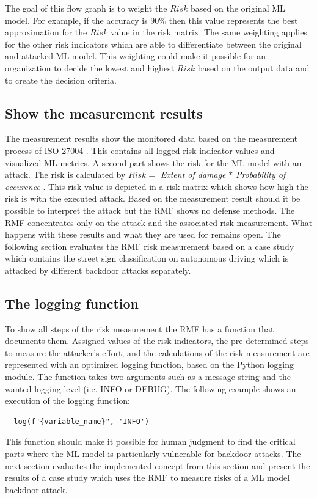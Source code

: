 The goal of this flow graph is to weight the $Risk$ based on the original ML model. For example, if the accuracy is $90\%$ then this value represents the best approximation for the $Risk$ value in the risk matrix. The same weighting applies for the other risk indicators which are able to differentiate between the original and attacked ML model. This weighting could make it possible for an organization to decide the lowest and highest $Risk$ based on the output data and to create the decision criteria.

\subsection{Show the measurement results}
\label{sec:impl_meas_res}

The measurement results show the monitored data based on the measurement process of ISO 27004 \cite{ISO_27004_2009}. This contains all logged risk indicator values and visualized ML metrics. A second part shows the risk for the ML model with an attack. The risk is calculated by $Risk = $ \textit{Extent of damage} $*$ \textit{Probability of occurence} \cite{DBLP:journals/access/JianxingHSH21}. This risk value is depicted in a risk matrix which shows how high the risk is with the executed attack. Based on the measurement result should it be possible to interpret the attack but the RMF shows no defense methods. The RMF concentrates only on the attack and the associated risk measurement. What happens with these results and what they are used for remains open. The following section evaluates the RMF risk measurement based on a case study which contains the street sign classification on autonomous driving which is attacked by different backdoor attacks separately.

\subsection{The logging function}

To show all steps of the risk measurement the RMF has a function that documents them. Assigned values of the risk indicators, the pre-determined steps to measure the attacker's effort, and the calculations of the risk measurement are represented with an optimized logging function, based on the Python logging module. The function takes two arguments such as a message string and the wanted logging level (i.e. INFO or DEBUG). The following example shows an execution of the logging function:

\begin{lstlisting}
  log(f"{variable_name}", 'INFO')
\end{lstlisting}

This function should make it possible for human judgment to find the critical parts where the ML model is particularly vulnerable for backdoor attacks. The next section evaluates the implemented concept from this section and present the results of a case study which uses the RMF to measure risks of a ML model backdoor attack.
